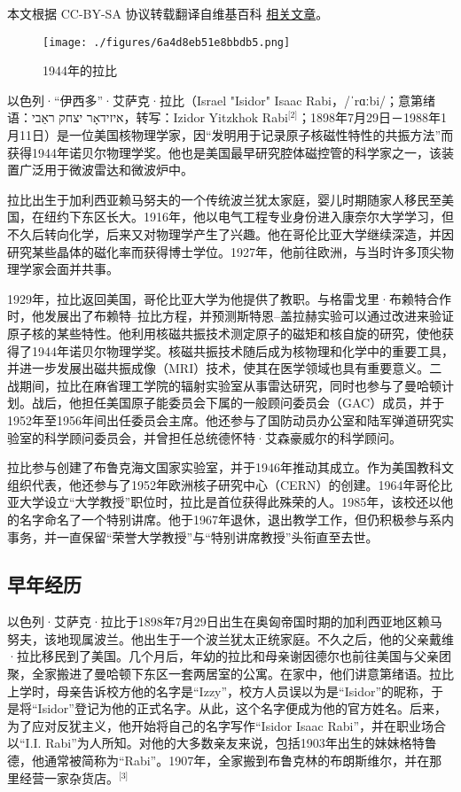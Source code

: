 
本文根据 CC-BY-SA 协议转载翻译自维基百科 \href{https://en.wikipedia.org/wiki/Isidor_Isaac_Rabi}{相关文章}。

\begin{figure}[ht]
\centering
\texttt{[image: ./figures/6a4d8eb51e8bbdb5.png]}
\caption{1944年的拉比} \label{fig_YXDlb_1}
\end{figure}
以色列·“伊西多”·艾萨克·拉比（Israel "Isidor" Isaac Rabi，/ˈrɑːbi/；意第绪语：איזידאָר יצחק ראַבי，转写：Izidor Yitzkhok Rabi\(^\text{[2]}\)；1898年7月29日－1988年1月11日）是一位美国核物理学家，因“发明用于记录原子核磁性特性的共振方法”而获得1944年诺贝尔物理学奖。他也是美国最早研究腔体磁控管的科学家之一，该装置广泛用于微波雷达和微波炉中。

拉比出生于加利西亚赖马努夫的一个传统波兰犹太家庭，婴儿时期随家人移民至美国，在纽约下东区长大。1916年，他以电气工程专业身份进入康奈尔大学学习，但不久后转向化学，后来又对物理学产生了兴趣。他在哥伦比亚大学继续深造，并因研究某些晶体的磁化率而获得博士学位。1927年，他前往欧洲，与当时许多顶尖物理学家会面并共事。

1929年，拉比返回美国，哥伦比亚大学为他提供了教职。与格雷戈里·布赖特合作时，他发展出了布赖特–拉比方程，并预测斯特恩–盖拉赫实验可以通过改进来验证原子核的某些特性。他利用核磁共振技术测定原子的磁矩和核自旋的研究，使他获得了1944年诺贝尔物理学奖。核磁共振技术随后成为核物理和化学中的重要工具，并进一步发展出磁共振成像（MRI）技术，使其在医学领域也具有重要意义。二战期间，拉比在麻省理工学院的辐射实验室从事雷达研究，同时也参与了曼哈顿计划。战后，他担任美国原子能委员会下属的一般顾问委员会（GAC）成员，并于1952年至1956年间出任委员会主席。他还参与了国防动员办公室和陆军弹道研究实验室的科学顾问委员会，并曾担任总统德怀特·艾森豪威尔的科学顾问。

拉比参与创建了布鲁克海文国家实验室，并于1946年推动其成立。作为美国教科文组织代表，他还参与了1952年欧洲核子研究中心（CERN）的创建。1964年哥伦比亚大学设立“大学教授”职位时，拉比是首位获得此殊荣的人。1985年，该校还以他的名字命名了一个特别讲席。他于1967年退休，退出教学工作，但仍积极参与系内事务，并一直保留“荣誉大学教授”与“特别讲席教授”头衔直至去世。
\subsection{早年经历}
以色列·艾萨克·拉比于1898年7月29日出生在奥匈帝国时期的加利西亚地区赖马努夫，该地现属波兰。他出生于一个波兰犹太正统家庭。不久之后，他的父亲戴维·拉比移民到了美国。几个月后，年幼的拉比和母亲谢因德尔也前往美国与父亲团聚，全家搬进了曼哈顿下东区一套两居室的公寓。在家中，他们讲意第绪语。拉比上学时，母亲告诉校方他的名字是“Izzy”，校方人员误以为是“Isidor”的昵称，于是将“Isidor”登记为他的正式名字。从此，这个名字便成为他的官方姓名。后来，为了应对反犹主义，他开始将自己的名字写作“Isidor Isaac Rabi”，并在职业场合以“I.I. Rabi”为人所知。对他的大多数亲友来说，包括1903年出生的妹妹格特鲁德，他通常被简称为“Rabi”。1907年，全家搬到布鲁克林的布朗斯维尔，并在那里经营一家杂货店。\(^\text{[3]}\)

